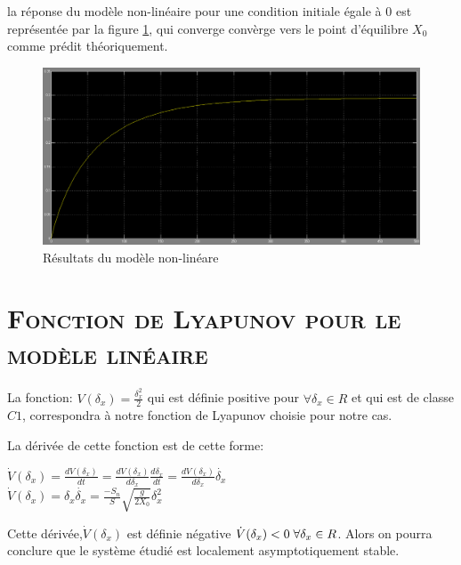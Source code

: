 la réponse du modèle non-linéaire pour une condition initiale égale à $0$ est représentée par la figure \ref{fig:nonlinéar}, qui converge convèrge vers le point d'équilibre $X_0$ comme prédit théoriquement.



\begin{figure}[H]
    \centering
    \includegraphics[width=\textwidth]{nonlinear.PNG}
    \caption{Résultats du modèle non-linéare }
    \label{fig:nonlinéar}
\end{figure}     


\section{\textsc{Fonction de Lyapunov pour le modèle linéaire}}

	\paragraph{}
	La fonction: $V(\delta_x)=\frac{\delta_x^2}{2}$ qui est définie positive pour $\forall \delta_x \in R $ et qui est de classe $C1$, correspondra à notre fonction de Lyapunov choisie pour notre cas.\\

	\par	 La dérivée de cette fonction est de cette forme: 
	\begin{center}
		$\dot{V}(\delta_x) = \frac{dV(\delta_x)}{dt} = \frac{dV(\delta_x)}{d\delta_x} \frac{d\delta_x}{dt} = \frac{dV(\delta_x)}{d\delta_x} \dot{\delta_x} $\\[0.25 cm]
		$ \dot{V}(\delta_x) = \delta_x \dot{\delta_x} = \frac{-S_n}{S} \sqrt{\frac{g}{2X_0}} \delta_x^2 $\\[0.25 cm]
	\end{center} 
	\par Cette dérivée,$\dot{V}(\delta_x)$ est définie négative $\dot{V}(\delta_x)<0 \hspace{1mm} \forall \delta_x \in R $. Alors on pourra conclure que le système étudié est localement asymptotiquement stable.
	
